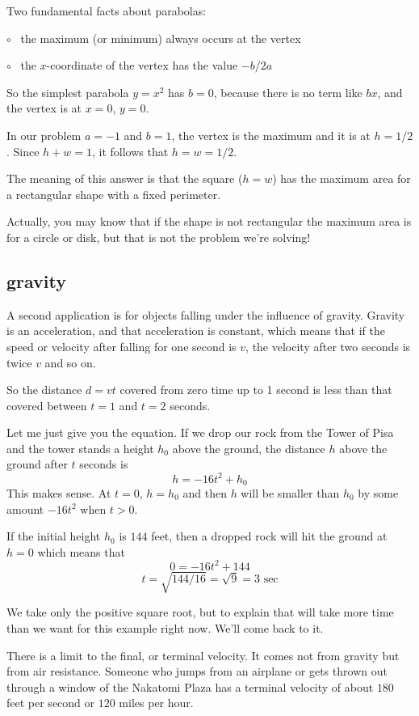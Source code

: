 \documentclass[11pt, oneside]{article}
\begin{document}
Two fundamental facts about parabolas:   

$\circ$ \ the maximum (or minimum) always occurs at the vertex

$\circ$ \ the $x$-coordinate of the vertex has the value $-b/2a$

So the simplest parabola $y = x^2$ has $b = 0$, because there is no term like $bx$, and the vertex is at $x = 0$, $y = 0$.

In our problem $a = -1$ and $b = 1$, the vertex is the maximum and it is at $h = 1/2$.   Since $h + w = 1$, it follows that $h = w = 1/2$.

The meaning of this answer is that the square ($h = w$) has the maximum area for a rectangular shape with a fixed perimeter.

Actually, you may know that if the shape is not rectangular the maximum area is for a circle or disk, but that is not the problem we're solving!

\subsection*{gravity}

A second application is for objects falling under the influence of gravity.  Gravity is an acceleration, and that acceleration is constant, which means that if the speed or velocity after falling for one second is $v$, the velocity after two seconds is twice $v$ and so on.  

So the distance $d = vt$ covered from zero time up to 1 second is less than that covered between $t = 1$ and $t = 2$ seconds.  

Let me just give you the equation.  If we drop our rock from the Tower of Pisa and the tower stands a height $h_0$ above the ground, the distance $h$ above the ground after $t$ seconds is
\[ h = -16t^2 + h_0 \]
This makes sense.  At $t = 0$, $h = h_0$ and then $h$ will be smaller than $h_0$ by some amount $-16t^2$ when $t > 0$.

If the initial height $h_0$ is $144$ feet, then a dropped rock will hit the ground at $h=0$ which means that
\[ 0 = -16t^2 + 144 \]
\[ t = \sqrt{144/16} = \sqrt{9} = 3 \text{ sec} \]

We take only the positive square root, but to explain that will take more time than we want for this example right now.  We'll come back to it.

There is a limit to the final, or terminal velocity.  It comes not from gravity but from air resistance.  Someone who jumps from an airplane or gets thrown out through a window of the Nakatomi Plaza has a terminal velocity of about $180$ feet per second or $120$ miles per hour.
\end{document}
